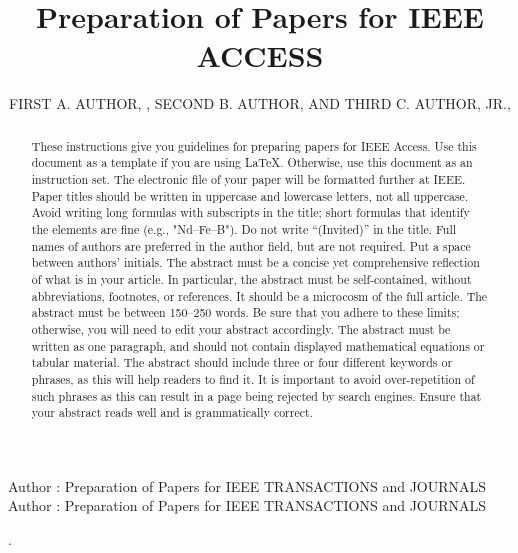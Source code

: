 \documentclass{ieeeaccess}
\begin{document}

\title{Preparation of Papers for IEEE ACCESS}
\author{\uppercase{First A. Author}, ,
\uppercase{Second B. Author, and Third C. Author,
Jr}.,
}
\address[1]{National Institute of Standards and 
Technology, Boulder, CO 80305 USA (e-mail: author@boulder.nist.gov)}
\address[2]{Department of Physics, Colorado State University, Fort Collins, 
CO 80523 USA (e-mail: author@lamar.colostate.edu)}
\address[3]{Electrical Engineering Department, University of Colorado, Boulder, CO 
80309 USA}

\markboth
{Author \headeretal: Preparation of Papers for IEEE TRANSACTIONS and JOURNALS}
{Author \headeretal: Preparation of Papers for IEEE TRANSACTIONS and JOURNALS}

.

\begin{abstract}
These instructions give you guidelines for preparing papers for 
IEEE Access. Use this document as a template if you are 
using \LaTeX. Otherwise, use this document as an 
instruction set. The electronic file of your paper will be formatted further 
at IEEE. Paper titles should be written in uppercase and lowercase letters, 
not all uppercase. Avoid writing long formulas with subscripts in the title; 
short formulas that identify the elements are fine (e.g., "Nd--Fe--B"). Do 
not write ``(Invited)'' in the title. Full names of authors are preferred in 
the author field, but are not required. Put a space between authors' 
initials. The abstract must be a concise yet comprehensive reflection of 
what is in your article. In particular, the abstract must be self-contained, 
without abbreviations, footnotes, or references. It should be a microcosm of 
the full article. The abstract must be between 150--250 words. Be sure that 
you adhere to these limits; otherwise, you will need to edit your abstract 
accordingly. The abstract must be written as one paragraph, and should not 
contain displayed mathematical equations or tabular material. The abstract 
should include three or four different keywords or phrases, as this will 
help readers to find it. It is important to avoid over-repetition of such 
phrases as this can result in a page being rejected by search engines. 
Ensure that your abstract reads well and is grammatically correct.
\end{abstract}
\end{document}
